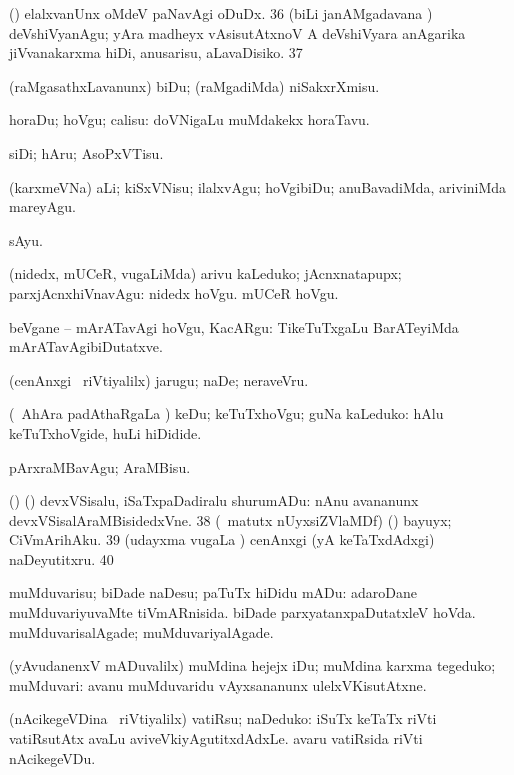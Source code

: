{{ (\rUpa) elalxvanUnx oMdeV paNavAgi
oDuDx. 
\num{36}  (biLi janAMgadavana \vi) deVshiVyanAgu; yAra
madheyx vAsisutAtxnoV A deVshiVyara anAgarika jiVvanakarxma hiDi, anusarisu,
aLavaDisiko. 
\num{37}  

 (raMgasathxLavanunx) biDu; (raMgadiMda)
niSakxrXmisu. 

 horaDu; hoVgu; calisu:  doVNigaLu
muMdakekx horaTavu. 

 siDi; hAru; AsoPxVTisu. 

 (karxmeVNa) aLi; kiSxVNisu; ilalxvAgu; hoVgibiDu; anuBavadiMda, ariviniMda mareyAgu. 

 sAyu.

 (nidedx, mUCeR, \mo vugaLiMda) arivu kaLeduko; jAcnxnatapupx; parxjAcnxhiVnavAgu:  nidedx hoVgu.  mUCeR hoVgu. 

 beVgane -- mArATavAgi hoVgu,
KacARgu:  TikeTuTxgaLu BarATeyiMda
mArATavAgibiDutatxve. 

 (cenAnxgi \mo\ riVtiyalilx) jarugu; naDe; neraveVru.

 (\kanmu\ AhAra padAthaRgaLa \vi) keDu; keTuTxhoVgu; guNa kaLeduko:
 hAlu keTuTxhoVgide, huLi hiDidide. 

 pArxraMBavAgu; AraMBisu. 

 (\birx) (\AmA) devxVSisalu, iSaTxpaDadiralu shurumADu:
 nAnu avananunx devxVSisalAraMBisidedxVne. 
\num{38}  (\AseTxrXV\ matutx nUyxsiZVlaMDf) (\ashi) bayuyx; CiVmArihAku.
\num{39}  (udayxma \mo vugaLa \vi)
cenAnxgi (yA keTaTxdAdxgi) naDeyutitxru. 
\num{40}  

 muMduvarisu; biDade naDesu; paTuTx hiDidu mADu:  adaroDane muMduvariyuvaMte tiVmARnisida.  biDade parxyatanxpaDutatxleV hoVda. 
muMduvarisalAgade; muMduvariyalAgade.  

 (yAvudanenxV mADuvalilx) muMdina hejejx iDu; muMdina karxma
tegeduko; muMduvari:  avanu muMduvaridu
vAyxsananunx ulelxVKisutAtxne.  

 (nAcikegeVDina \mo\ riVtiyalilx) vatiRsu; naDeduko:
 iSuTx keTaTx riVti
vatiRsutAtx avaLu aviveVkiyAgutitxdAdxLe. 
avaru vatiRsida riVti nAcikegeVDu. 

}}
